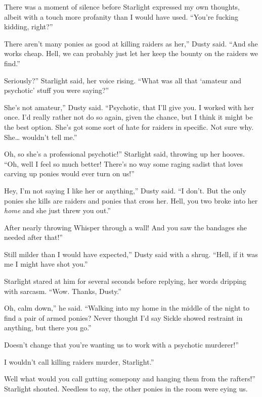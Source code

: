There was a moment of silence before Starlight expressed my own thoughts, albeit with a touch more profanity than I would have used. “You’re fucking kidding, right?”

\leavevmode{}There aren’t many ponies as good at killing raiders as her,” Dusty said. “And she works cheap. Hell, we can probably just let her keep the bounty on the raiders we find.”

\leavevmode{}Seriously?” Starlight said, her voice rising. “What was all that ‘amateur and psychotic’ stuff you were saying?”

\leavevmode{}She’s not amateur,” Dusty said. “Psychotic, that I’ll give you. I worked with her once. I’d really rather not do so again, given the chance, but I think it might be the best option. She’s got some sort of hate for raiders in specific. Not sure why. She… wouldn’t tell me.”

\leavevmode{}Oh, so she’s a professional psychotic!” Starlight said, throwing up her hooves. “Oh, well I feel so much better! There’s no way some raging sadist that loves carving up ponies would ever turn on us!”

\leavevmode{}Hey, I’m not saying I like her or anything,” Dusty said. “I don’t. But the only ponies she kills are raiders and ponies that cross her. Hell, you two broke into her \textit{home} and she just threw you out.”

\leavevmode{}After nearly throwing Whisper through a wall! And you saw the bandages she needed after that!”

\leavevmode{}Still milder than I would have expected,” Dusty said with a shrug. “Hell, if it was me I might have shot you.”

Starlight stared at him for several seconds before replying, her words dripping with sarcasm. “Wow. Thanks, Dusty.”

\leavevmode{}Oh, calm down,” he said. “Walking into my home in the middle of the night to find a pair of armed ponies? Never thought I’d say Sickle showed restraint in anything, but there you go.”

\leavevmode{}Doesn’t change that you’re wanting us to work with a psychotic murderer!”

\leavevmode{}I wouldn’t call killing raiders murder, Starlight.”

\leavevmode{}Well what would you call gutting somepony and hanging them from the rafters!” Starlight shouted. Needless to say, the other ponies in the room were eying us.

